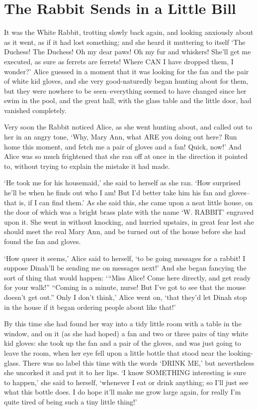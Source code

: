 \documentclass[12pt]{book}
\begin{document}
\chapter{The Rabbit Sends in a Little Bill}

  It was the White Rabbit, trotting slowly back again, and
looking anxiously about as it went, as if it had lost something;
and she heard it muttering to itself `The Duchess!  The Duchess!
Oh my dear paws!  Oh my fur and whiskers!  She'll get me
executed, as sure as ferrets are ferrets!  Where CAN I have
dropped them, I wonder?'  Alice guessed in a moment that it was
looking for the fan and the pair of white kid gloves, and she
very good-naturedly began hunting about for them, but they were
nowhere to be seen--everything seemed to have changed since her
swim in the pool, and the great hall, with the glass table and
the little door, had vanished completely.

  Very soon the Rabbit noticed Alice, as she went hunting about,
and called out to her in an angry tone, `Why, Mary Ann, what ARE
you doing out here?  Run home this moment, and fetch me a pair of
gloves and a fan!  Quick, now!'  And Alice was so much frightened
that she ran off at once in the direction it pointed to, without
trying to explain the mistake it had made.

  `He took me for his housemaid,' she said to herself as she ran.
`How surprised he'll be when he finds out who I am!  But I'd
better take him his fan and gloves--that is, if I can find them.'
As she said this, she came upon a neat little house, on the door
of which was a bright brass plate with the name `W. RABBIT'
engraved upon it.  She went in without knocking, and hurried
upstairs, in great fear lest she should meet the real Mary Ann,
and be turned out of the house before she had found the fan and
gloves.

  `How queer it seems,' Alice said to herself, `to be going
messages for a rabbit!  I suppose Dinah'll be sending me on
messages next!'  And she began fancying the sort of thing that
would happen:  `{}``Miss Alice!  Come here directly, and get ready
for your walk!'' ``Coming in a minute, nurse!  But I've got to see
that the mouse doesn't get out.''  Only I don't think,' Alice went
on, `that they'd let Dinah stop in the house if it began ordering
people about like that!'

  By this time she had found her way into a tidy little room with
a table in the window, and on it (as she had hoped) a fan and two
or three pairs of tiny white kid gloves:  she took up the fan and
a pair of the gloves, and was just going to leave the room, when
her eye fell upon a little bottle that stood near the looking-
glass.  There was no label this time with the words `DRINK ME,'
but nevertheless she uncorked it and put it to her lips.  `I know
SOMETHING interesting is sure to happen,' she said to herself,
`whenever I eat or drink anything; so I'll just see what this
bottle does.  I do hope it'll make me grow large again, for
really I'm quite tired of being such a tiny little thing!'
\end{document}
